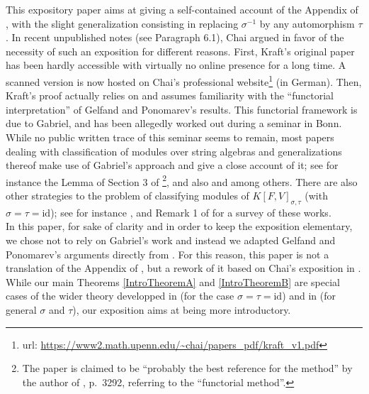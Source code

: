 \documentclass[12pt]{amsart}
\theoremstyle{definition}
\newcommand{\<}{\langle}   %
\renewcommand{\>}{\rangle} %
\begin{document}
This expository paper aims at giving a self-contained account of the Appendix of \cite{kraft:1975}, with the slight generalization consisting in replacing $\sigma^{-1}$ by any automorphism $\tau$. In recent unpublished notes \cite{chai:kraft2025} (see Paragraph 6.1), Chai argued in favor of the necessity of such an exposition for different reasons. First, Kraft's original paper \cite{kraft:1975} has been hardly accessible with virtually no online presence for a long time. A scanned version is now hosted on Chai's professional website\footnote{url: \url{https://www2.math.upenn.edu/~chai/papers_pdf/kraft_v1.pdf}} (in German). Then, Kraft's proof actually relies on and assumes familiarity with the ``functorial interpretation'' of Gelfand and Ponomarev's results. This functorial framework is due to Gabriel, and has been allegedly worked out during a seminar in Bonn. While no public written trace of this seminar seems to remain, most papers dealing with classification of modules over string algebras and generalizations thereof make use of Gabriel's approach and give a close account of it; see for instance the Lemma of Section 3 of \cite{ringel:1975}\footnote{The paper \cite{ringel:1975} is claimed to be ``probably the best reference for the method'' by the author of \cite{crawley-boevey:2017}, p.~3292, referring to the ``functorial method''.}, and also \cite{crawley-boevey:2017} and \cite{clannishalgebras:2024} among others. There are also other strategies to the problem of classifying modules of $K[F,V]_{\sigma,\tau}$ (with $\sigma = \tau = \mathrm{id}$); see for instance \cite{nazarova:1975, schroer:2004, oblak:2008, bondarenko:2009, liuzhang:2011}, and Remark 1 of \cite{bondarenko:2009} for a survey of these works.\\

In this paper, for sake of clarity and in order to keep the exposition elementary, we chose not to rely on Gabriel's work and instead we adapted Gelfand and Ponomarev's arguments directly from \cite{gelfand-ponomarev:1968}. For this reason, this paper is not a translation of the Appendix of \cite{kraft:1975}, but a rework of it based on Chai's exposition in \cite{chai:kraft2025}. While our main Theorems \ref{IntroTheoremA} and \ref{IntroTheoremB} are special cases of the wider theory developped in \cite{crawley-boevey:2017} (for the case $\sigma=\tau=\mathrm{id}$) and in \cite{clannishalgebras:2024} (for general $\sigma$ and $\tau$), our exposition aims at being more introductory.\\
\end{document}
